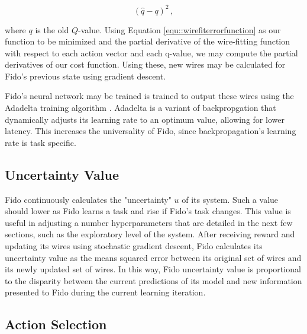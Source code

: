 \begin{equation}
	(\hat{q} - q)^2
	\,,
	\label{equ::wirefiterrorfunction}
\end{equation}

\noindent

where $q$ is the old $Q$-value.
Using Equation \ref{equ::wirefiterrorfunction} as our function to be minimized and the partial derivative of the wire-fitting function with respect to each action vector and each q-value, we may compute the partial derivatives of our cost function.
Using these, new wires may be calculated for Fido's previous state using gradient descent.

Fido's neural network may be trained is trained to output these wires using the Adadelta training algorithm \cite{zeiler}. Adadelta is a variant of backpropgation that dynamically adjusts its learning rate to an optimum value, allowing for lower latency. This increases the universality of Fido, since backpropagation's learning rate is task specific.

\subsection{Uncertainty Value}

Fido continuously calculates the "uncertainty" $u$ of its system. Such a value should lower as Fido learns a task and rise if Fido's task changes. This value is useful in adjusting a number hyperparameters that are detailed in the next few sections, such as the exploratory level of the system. After receiving reward and updating its wires using stochastic gradient descent, Fido calculates its uncertainty value as the means squared error between its original set of wires and its newly updated set of wires. In this way, Fido uncertainty value is proportional to the disparity between the current predictions of its model and new information presented to Fido during the current learning iteration.

\subsection{Action Selection}

